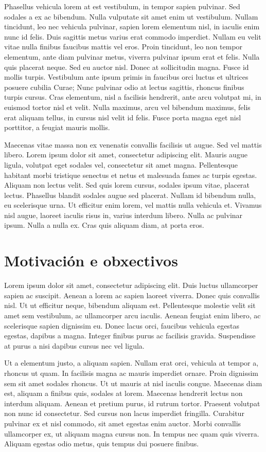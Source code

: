 \documentclass{pfc}
\begin{document}
Phasellus vehicula lorem at est vestibulum, in tempor sapien
pulvinar. Sed sodales a ex ac bibendum. Nulla vulputate sit amet enim
ut vestibulum. Nullam tincidunt, leo nec vehicula pulvinar, sapien
lorem elementum nisl, in iaculis enim nunc id felis. Duis sagittis
metus varius erat commodo imperdiet. Nullam eu velit vitae nulla
finibus faucibus mattis vel eros. Proin tincidunt, leo non tempor
elementum, ante diam pulvinar metus, viverra pulvinar ipsum erat et
felis. Nulla quis placerat neque. Sed eu auctor nisl. Donec at
sollicitudin magna. Fusce id mollis turpis. Vestibulum ante ipsum
primis in faucibus orci luctus et ultrices posuere cubilia Curae; Nunc
pulvinar odio at lectus sagittis, rhoncus finibus turpis cursus. Cras
elementum, nisl a facilisis hendrerit, ante arcu volutpat mi, in
euismod tortor nisl et velit. Nulla maximus, arcu vel bibendum
maximus, felis erat aliquam tellus, in cursus nisl velit id
felis. Fusce porta magna eget nisl porttitor, a feugiat mauris mollis.

Maecenas vitae massa non ex venenatis convallis facilisis ut
augue. Sed vel mattis libero. Lorem ipsum dolor sit amet, consectetur
adipiscing elit. Mauris augue ligula, volutpat eget sodales vel,
consectetur sit amet magna. Pellentesque habitant morbi tristique
senectus et netus et malesuada fames ac turpis egestas. Aliquam non
lectus velit. Sed quis lorem cursus, sodales ipsum vitae, placerat
lectus. Phasellus blandit sodales augue sed placerat. Nullam id
bibendum nulla, eu scelerisque urna. Ut efficitur enim lorem, vel
mattis nulla vehicula et. Vivamus nisl augue, laoreet iaculis risus
in, varius interdum libero. Nulla ac pulvinar ipsum. Nulla a nulla
ex. Cras quis aliquam diam, at porta eros.

\section{Motivación e obxectivos}

Lorem ipsum dolor sit amet, consectetur adipiscing elit. Duis luctus
ullamcorper sapien ac suscipit. Aenean a lorem ac sapien laoreet
viverra. Donec quis convallis nisl. Ut ut efficitur neque, bibendum
aliquam est. Pellentesque molestie velit sit amet sem vestibulum, ac
ullamcorper arcu iaculis. Aenean feugiat enim libero, ac scelerisque
sapien dignissim eu. Donec lacus orci, faucibus vehicula egestas
egestas, dapibus a magna. Integer finibus purus ac facilisis
gravida. Suspendisse at purus a nisi dapibus cursus nec vel ligula.

Ut a elementum justo, a aliquam sapien. Nullam erat orci, vehicula at
tempor a, rhoncus ut quam. In facilisis magna ac mauris imperdiet
ornare. Proin dignissim sem sit amet sodales rhoncus. Ut ut mauris at
nisl iaculis congue. Maecenas diam est, aliquam a finibus quis,
sodales at lorem. Maecenas hendrerit lectus non interdum
aliquam. Aenean et pretium purus, id rutrum tortor. Praesent volutpat
non nunc id consectetur. Sed cursus non lacus imperdiet
fringilla. Curabitur pulvinar ex et nisl commodo, sit amet egestas
enim auctor. Morbi convallis ullamcorper ex, ut aliquam magna cursus
non. In tempus nec quam quis viverra. Aliquam egestas odio metus, quis
tempus dui posuere finibus.
\end{document}
